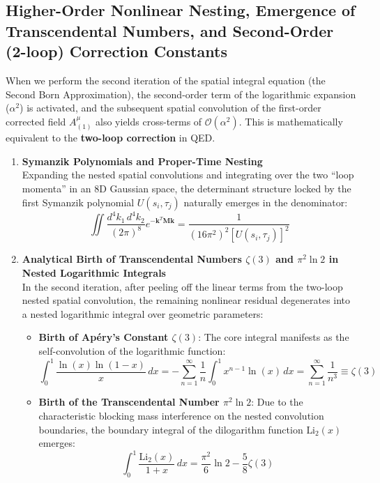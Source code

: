 \documentclass[12pt, a4paper]{article}
\begin{document}
\subsection{Higher-Order Nonlinear Nesting, Emergence of Transcendental Numbers, and Second-Order (2-loop) Correction Constants}

When we perform the second iteration of the spatial integral equation (the Second Born Approximation), the second-order term of the logarithmic expansion ($\alpha^2$) is activated, and the subsequent spatial convolution of the first-order corrected field $A_{(1)}^\mu$ also yields cross-terms of $\mathcal{O}(\alpha^2)$. This is mathematically equivalent to the \textbf{two-loop correction} in QED.

\begin{enumerate}
    \item \textbf{Symanzik Polynomials and Proper-Time Nesting} \\
    Expanding the nested spatial convolutions and integrating over the two ``loop momenta'' in an 8D Gaussian space, the determinant structure locked by the first Symanzik polynomial $U(s_i, \tau_j)$ naturally emerges in the denominator:
    \begin{equation}
    \iint \frac{d^4k_1 \, d^4k_2}{(2\pi)^8} e^{-\mathbf{k}^T \mathbf{M} \mathbf{k}} = \frac{1}{(16\pi^2)^2 [U(s_i, \tau_j)]^2}
    \end{equation}
    
    \item \textbf{Analytical Birth of Transcendental Numbers $\zeta(3)$ and $\pi^2 \ln 2$ in Nested Logarithmic Integrals} \\
    In the second iteration, after peeling off the linear terms from the two-loop nested spatial convolution, the remaining nonlinear residual degenerates into a nested logarithmic integral over geometric parameters:
    \begin{itemize}
        \item \textbf{Birth of Ap{\'e}ry's Constant $\zeta(3)$}: The core integral manifests as the self-convolution of the logarithmic function:
        \begin{equation}
        \int_0^1 \frac{\ln(x) \ln(1-x)}{x} \, dx = -\sum_{n=1}^\infty \frac{1}{n} \int_0^1 x^{n-1} \ln(x) \, dx = \sum_{n=1}^\infty \frac{1}{n^3} \equiv \zeta(3)
        \end{equation}
        
        \item \textbf{Birth of the Transcendental Number $\pi^2 \ln 2$}: Due to the characteristic blocking mass interference on the nested convolution boundaries, the boundary integral of the dilogarithm function $\text{Li}_2(x)$ emerges:
        \begin{equation}
        \int_0^1 \frac{\text{Li}_2(x)}{1+x} \, dx = \frac{\pi^2}{6}\ln 2 - \frac{5}{8}\zeta(3)
        \end{equation}
    \end{itemize}
    

\end{enumerate}
\end{document}
